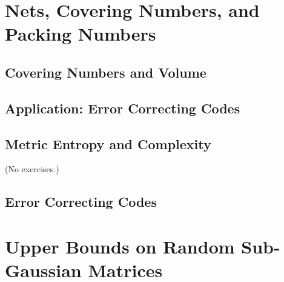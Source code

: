 \documentclass{report}
\theoremstyle{definition}
\newenvironment{exercise}[1]{
  \renewcommand\theexerciseimpl{#1}
  \exerciseimpl
}{\endexerciseimpl}
\begin{document}
\begin{exercise}{4.1.6}
\end{exercise}

\begin{exercise}{4.1.8}
\end{exercise}

\section{Nets, Covering Numbers, and Packing Numbers}

\begin{exercise}{4.2.5}
\end{exercise}

\begin{exercise}{4.2.9}
\end{exercise}

\begin{exercise}{4.2.10}
\end{exercise}

\subsection{Covering Numbers and Volume}

\begin{exercise}{4.2.15}
\end{exercise}

\begin{exercise}{4.2.16}
\end{exercise}

\subsection{Application: Error Correcting Codes}

\subsection{Metric Entropy and Complexity}

(No exercises.)

\subsection{Error Correcting Codes}

\begin{exercise}{4.3.7}
\end{exercise}

\section{Upper Bounds on Random Sub-Gaussian Matrices}
\end{document}
